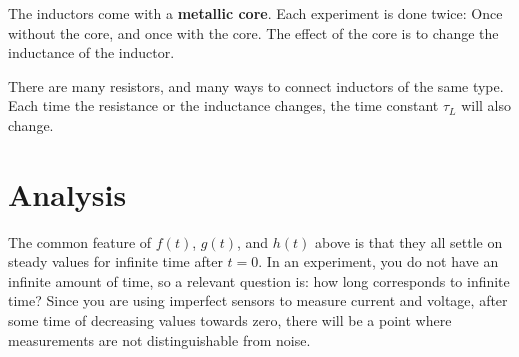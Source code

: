 The inductors come with a \textbf{metallic core}. Each experiment is done twice: Once without the core, and once with the core. The effect of the core is to change the inductance of the inductor.

There are many resistors, and many ways to connect inductors of the same type. Each time the resistance or the inductance changes, the time constant $\tau_{L}$ will also change.
\section{Analysis}
The common feature of $f(t)$, $g(t)$, and $h(t)$ above is that they all settle on steady values for infinite time after $t = 0$. In an experiment, you do not have an infinite amount of time, so a relevant question is: how long corresponds to infinite time? Since you are using imperfect sensors to measure current and voltage, after some time of decreasing values towards zero, there will be a point where measurements are not distinguishable from noise.

